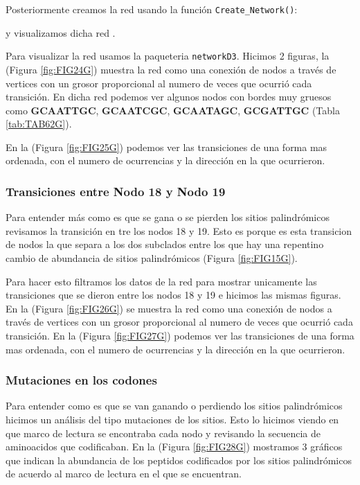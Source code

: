 \documentclass[
]{book}
\begin{document}
Posteriormente creamos la red usando la función \texttt{Create\_Network()}:

y visualizamos dicha red .

Para visualizar la red usamos la paqueteria \texttt{networkD3}. Hicimos 2 figuras, la (Figura \ref{fig:FIG24G}) muestra la red como una conexión de nodos a través de vertices con un grosor proporcional al numero de veces que ocurrió cada transición. En dicha red podemos ver algunos nodos con bordes muy gruesos como \textbf{GCAATTGC}, \textbf{GCAATCGC}, \textbf{GCAATAGC}, \textbf{GCGATTGC} (Tabla \ref{tab:TAB62G}).

En la (Figura \ref{fig:FIG25G}) podemos ver las transiciones de una forma mas ordenada, con el numero de ocurrencias y la dirección en la que ocurrieron.

\hypertarget{transiciones-entre-nodo-18-y-nodo-19-1}{%
\subsubsection{Transiciones entre Nodo 18 y Nodo 19}\label{transiciones-entre-nodo-18-y-nodo-19-1}}

Para entender más como es que se gana o se pierden los sitios palindrómicos revisamos la transición en tre los nodos 18 y 19. Esto es porque es esta transicion de nodos la que separa a los dos subclados entre los que hay una repentino cambio de abundancia de sitios palindrómicos (Figura \ref{fig:FIG15G}).

Para hacer esto filtramos los datos de la red para mostrar unicamente las transiciones que se dieron entre los nodos 18 y 19 e hicimos las mismas figuras.
En la (Figura \ref{fig:FIG26G}) se muestra la red como una conexión de nodos a través de vertices con un grosor proporcional al numero de veces que ocurrió cada transición. En la (Figura \ref{fig:FIG27G}) podemos ver las transiciones de una forma mas ordenada, con el numero de ocurrencias y la dirección en la que ocurrieron.

\hypertarget{mutaciones-en-los-codones-4}{%
\subsubsection{Mutaciones en los codones}\label{mutaciones-en-los-codones-4}}

Para entender como es que se van ganando o perdiendo los sitios palindrómicos hicimos un análisis del tipo mutaciones de los sitios. Esto lo hicimos viendo en que marco de lectura se encontraba cada nodo y revisando la secuencia de aminoacidos que codificaban. En la (Figura \ref{fig:FIG28G}) mostramos 3 gráficos que indican la abundancia de los peptidos codificados por los sitios palindrómicos de acuerdo al marco de lectura en el que se encuentran.
\end{document}
